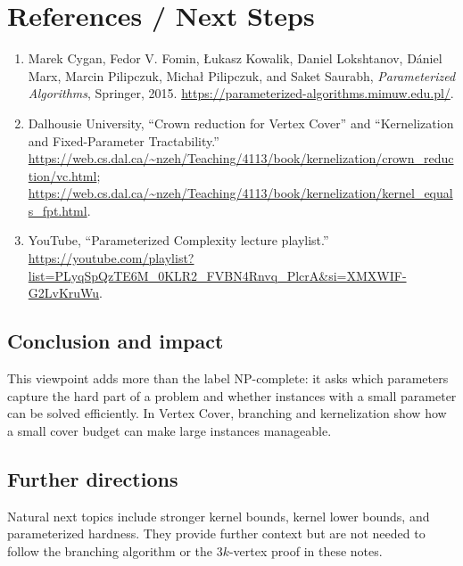 \documentclass[11pt]{article}
\begin{document}
\section{References / Next Steps}

\begin{enumerate}
  \item Marek Cygan, Fedor V. Fomin, \L{}ukasz Kowalik, Daniel Lokshtanov, D\'aniel Marx, Marcin Pilipczuk, Micha\l{} Pilipczuk, and Saket Saurabh, \emph{Parameterized Algorithms}, Springer, 2015. \url{https://parameterized-algorithms.mimuw.edu.pl/}.
  \item Dalhousie University, ``Crown reduction for Vertex Cover'' and ``Kernelization and Fixed-Parameter Tractability.'' \url{https://web.cs.dal.ca/~nzeh/Teaching/4113/book/kernelization/crown_reduction/vc.html}; \url{https://web.cs.dal.ca/~nzeh/Teaching/4113/book/kernelization/kernel_equals_fpt.html}.
  \item YouTube, ``Parameterized Complexity lecture playlist.'' \url{https://youtube.com/playlist?list=PLyqSpQzTE6M_0KLR2_FVBN4Rnvq_PlcrA&si=XMXWIF-G2LvKruWu}.
\end{enumerate}

\subsection*{Conclusion and impact}

This viewpoint adds more than the label NP-complete: it asks which parameters capture the hard part of a problem and whether instances with a small parameter can be solved efficiently. In Vertex Cover, branching and kernelization show how a small cover budget can make large instances manageable.

\subsection*{Further directions}

Natural next topics include stronger kernel bounds, kernel lower bounds, and parameterized hardness. They provide further context but are not needed to follow the branching algorithm or the $3k$-vertex proof in these notes.
\end{document}
